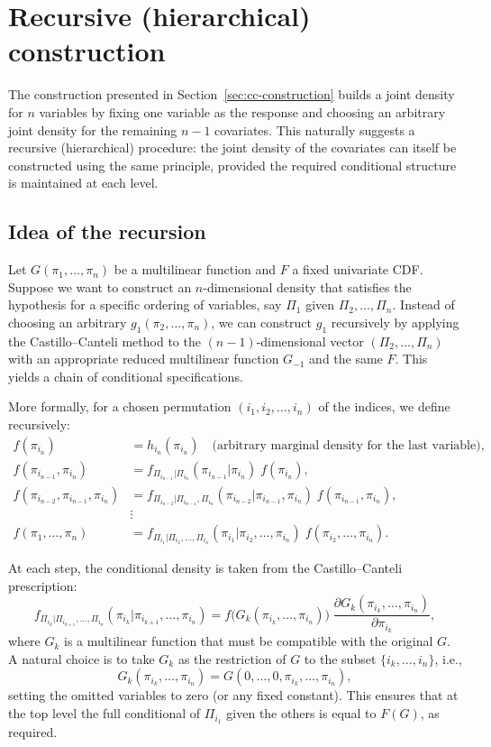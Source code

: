 \section{Recursive (hierarchical) construction}
\label{sec:cc-recursion}

The construction presented in Section~\ref{sec:cc-construction} builds a joint density for \(n\) variables by fixing one variable as the response and choosing an arbitrary joint density for the remaining \(n-1\) covariates. This naturally suggests a recursive (hierarchical) procedure: the joint density of the covariates can itself be constructed using the same principle, provided the required conditional structure is maintained at each level.

\subsection{Idea of the recursion}

Let \(G(\pi_1,\ldots,\pi_n)\) be a multilinear function and \(F\) a fixed univariate CDF. Suppose we want to construct an \(n\)-dimensional density that satisfies the hypothesis for a specific ordering of variables, say \(\Pi_1\) given \(\Pi_2,\ldots,\Pi_n\). Instead of choosing an arbitrary \(g_1(\pi_2,\ldots,\pi_n)\), we can construct \(g_1\) recursively by applying the Castillo–Canteli method to the \((n-1)\)-dimensional vector \((\Pi_2,\ldots,\Pi_n)\) with an appropriate reduced multilinear function \(G_{-1}\) and the same \(F\). This yields a chain of conditional specifications.

More formally, for a chosen permutation \((i_1,i_2,\ldots,i_n)\) of the indices, we define recursively:
\begin{align}
f(\pi_{i_n}) &= h_{i_n}(\pi_{i_n}) \quad \text{(arbitrary marginal density for the last variable)},\\
f(\pi_{i_{n-1}},\pi_{i_n}) &= f_{\Pi_{i_{n-1}}|\Pi_{i_n}}(\pi_{i_{n-1}}|\pi_{i_n})\; f(\pi_{i_n}),\\
f(\pi_{i_{n-2}},\pi_{i_{n-1}},\pi_{i_n}) &= f_{\Pi_{i_{n-2}}|\Pi_{i_{n-1}},\Pi_{i_n}}(\pi_{i_{n-2}}|\pi_{i_{n-1}},\pi_{i_n})\; f(\pi_{i_{n-1}},\pi_{i_n}),\\
&\vdots\\
f(\pi_1,\ldots,\pi_n) &= f_{\Pi_{i_1}|\Pi_{i_2},\ldots,\Pi_{i_n}}(\pi_{i_1}|\pi_{i_2},\ldots,\pi_{i_n})\; f(\pi_{i_2},\ldots,\pi_{i_n}).
\end{align}

At each step, the conditional density is taken from the Castillo–Canteli prescription:
\[
f_{\Pi_{i_k}|\Pi_{i_{k+1}},\ldots,\Pi_{i_n}}(\pi_{i_k}|\pi_{i_{k+1}},\ldots,\pi_{i_n}) = f\bigl(G_k(\pi_{i_k},\ldots,\pi_{i_n})\bigr)\;
\frac{\partial G_k(\pi_{i_k},\ldots,\pi_{i_n})}{\partial\pi_{i_k}},
\]
where \(G_k\) is a multilinear function that must be compatible with the original \(G\). A natural choice is to take \(G_k\) as the restriction of \(G\) to the subset \(\{i_k,\ldots,i_n\}\), i.e.,
\[
G_k(\pi_{i_k},\ldots,\pi_{i_n}) = G(0,\ldots,0,\pi_{i_k},\ldots,\pi_{i_n}),
\]
setting the omitted variables to zero (or any fixed constant). This ensures that at the top level the full conditional of \(\Pi_{i_1}\) given the others is equal to \(F(G)\), as required.

